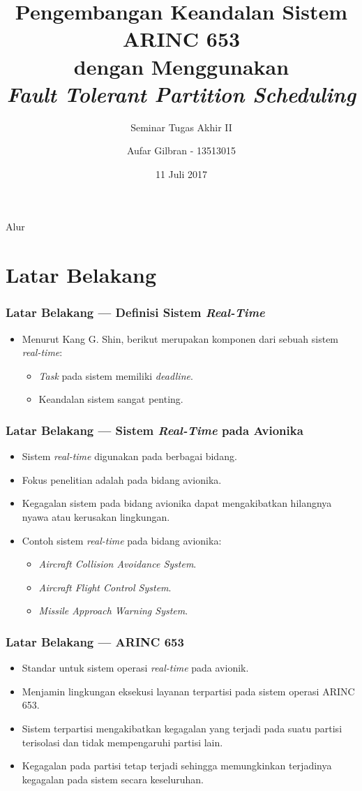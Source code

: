 \documentclass[xetex]{beamer}
\title{Pengembangan Keandalan Sistem ARINC 653\\dengan Menggunakan\\ \textit{Fault Tolerant Partition Scheduling}}
\subtitle{Seminar Tugas Akhir II}
\author{Aufar Gilbran - 13513015}
\date{11 Juli 2017}
\begin{document}
\frame{\titlepage}
\begin{frame}{Alur}
	\tableofcontents
\end{frame}

\section{Latar Belakang}
\begin{frame}
	\frametitle{Latar Belakang --- Definisi Sistem \textit{Real-Time}}
	\begin{itemize}
		\item Menurut Kang G. Shin, berikut merupakan komponen dari sebuah sistem \textit{real-time}: 
			\begin{itemize}
				\item \textit{Task} pada sistem memiliki \textit{deadline}.
				\item Keandalan sistem sangat penting.
			\end{itemize}
	\end{itemize}
\end{frame}
\begin{frame}
	\frametitle{Latar Belakang --- Sistem \textit{Real-Time} pada Avionika}
	\begin{itemize}
		\item Sistem \textit{real-time} digunakan pada berbagai bidang.
		\item Fokus penelitian adalah pada bidang avionika.
		\item Kegagalan sistem pada bidang avionika dapat mengakibatkan hilangnya nyawa atau kerusakan lingkungan.
		\item Contoh sistem \textit{real-time} pada bidang avionika:
			\begin{itemize}
				\item \textit{Aircraft Collision Avoidance System}.
				\item \textit{Aircraft Flight Control System}.
				\item \textit{Missile Approach Warning System}.
			\end{itemize}
	\end{itemize}
\end{frame}
\begin{frame}
	\frametitle{Latar Belakang --- ARINC 653}
	\begin{itemize}
		\item Standar untuk sistem operasi \textit{real-time} pada avionik.
		\item Menjamin lingkungan eksekusi layanan terpartisi pada sistem operasi ARINC 653.
		\item Sistem terpartisi mengakibatkan kegagalan yang terjadi pada suatu partisi terisolasi dan tidak mempengaruhi partisi lain.
		\item Kegagalan pada partisi tetap terjadi sehingga memungkinkan terjadinya kegagalan pada sistem secara keseluruhan.
	\end{itemize}
\end{frame}
\end{document}
